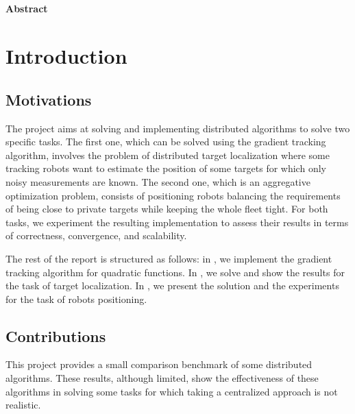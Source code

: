 \documentclass[a4paper,11pt,oneside]{book}
\begin{document}
\newpage
\thispagestyle{empty}

\begin{center}
\chapter*{}
\thispagestyle{empty}
{\Huge \textbf{Abstract}}\\
\vspace{15mm}
\end{center}

\tableofcontents \thispagestyle{empty}

\chapter*{Introduction}

\section*{Motivations} 

The project aims at solving and implementing distributed algorithms to solve two specific tasks. The first one, which can be solved using the gradient tracking algorithm, involves the problem of distributed target localization where some tracking robots want to estimate the position of some targets for which only noisy measurements are known. The second one, which is an aggregative optimization problem, consists of positioning robots balancing the requirements of being close to private targets while keeping the whole fleet tight. For both tasks, we experiment the resulting implementation to assess their results in terms of correctness, convergence, and scalability.

The rest of the report is structured as follows: in , we implement the gradient tracking algorithm for quadratic functions. In , we solve and show the results for the task of target localization. In , we present the solution and the experiments for the task of robots positioning.


\section*{Contributions}

This project provides a small comparison benchmark of some distributed algorithms. These results, although limited, show the effectiveness of these algorithms in solving some tasks for which taking a centralized approach is not realistic. 
\end{document}
